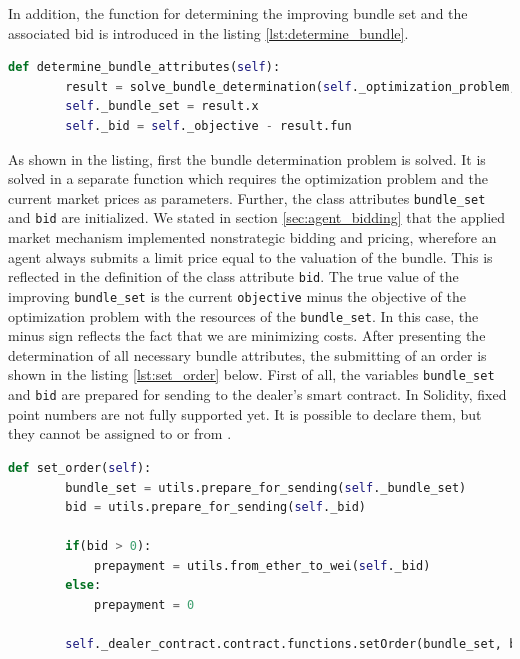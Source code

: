 In addition, the function for determining the improving bundle set and the associated bid is introduced in the listing \ref{lst:determine_bundle}.

\begin{lstlisting}[label=lst:determine_bundle, caption=Determining of bundle attributes, language=Python]
    def determine_bundle_attributes(self):
        result = solve_bundle_determination(self._optimization_problem, self._mkt_prices)
        self._bundle_set = result.x
        self._bid = self._objective - result.fun
\end{lstlisting}

As shown in the listing, first the bundle determination problem is solved.
It is solved in a separate function which requires the optimization problem and the current market prices as parameters.
Further, the class attributes \verb|bundle_set| and \verb|bid| are initialized.
We stated in section \ref{sec:agent_bidding} that the applied market mechanism implemented nonstrategic bidding and pricing, wherefore 
an agent always submits a limit price equal to the valuation of the bundle. 
This is reflected in the definition of the class attribute \verb|bid|. The true value of the improving \verb|bundle_set| 
is the current \verb|objective| minus the objective of the optimization problem with the resources of the \verb|bundle_set|.
In this case, the minus sign reflects the fact that we are minimizing costs.
After presenting the determination of all necessary bundle attributes, the submitting of an order is shown in the listing \ref{lst:set_order} below.
First of all, the variables \verb|bundle_set| and \verb|bid| are prepared for sending to the dealer's smart contract.
In Solidity, fixed point numbers are not fully supported yet. It is possible to declare them, but they cannot be assigned to or from .

\begin{lstlisting}[float=htbp, label=lst:set_order, caption=Submitting of order, language=Python]
    def set_order(self):
        bundle_set = utils.prepare_for_sending(self._bundle_set)
        bid = utils.prepare_for_sending(self._bid)
        
        if(bid > 0):
            prepayment = utils.from_ether_to_wei(self._bid)
        else:
            prepayment = 0

        self._dealer_contract.contract.functions.setOrder(bundle_set, bid, prepayment).transact({'from': self._account_address, 'value': prepayment})
\end{lstlisting}

